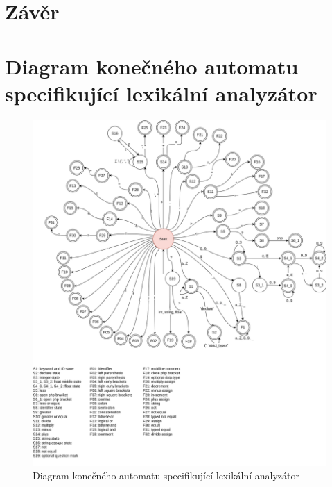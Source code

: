 \documentclass[a4paper, 12pt]{article}
\begin{document}
	\section{Závěr}




	\clearpage
	
	\renewcommand{\refname}{Literatura}
	



	\clearpage
	\appendix


	\section{Diagram konečného automatu specifikující lexikální analyzátor}
	\begin{figure}[!ht]
		\centering
		\includegraphics[width=0.95\linewidth]{fsm.png}
		\caption{Diagram konečného automatu specifikující lexikální analyzátor}
		\label{figure:fa_graph}
	\end{figure}

    \newpage
\end{document}

